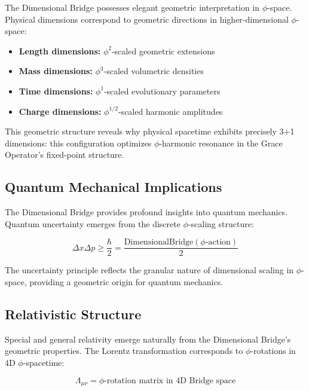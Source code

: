The Dimensional Bridge possesses elegant geometric interpretation in $\phi$-space. Physical dimensions correspond to geometric directions in higher-dimensional $\phi$-space:

\begin{itemize}
\item \textbf{Length dimensions:} $\phi^2$-scaled geometric extensions
\item \textbf{Mass dimensions:} $\phi^3$-scaled volumetric densities  
\item \textbf{Time dimensions:} $\phi^1$-scaled evolutionary parameters
\item \textbf{Charge dimensions:} $\phi^{1/2}$-scaled harmonic amplitudes
\end{itemize}

This geometric structure reveals why physical spacetime exhibits precisely 3+1 dimensions: this configuration optimizes $\phi$-harmonic resonance in the Grace Operator's fixed-point structure.

\subsection{Quantum Mechanical Implications}

The Dimensional Bridge provides profound insights into quantum mechanics. Quantum uncertainty emerges from the discrete $\phi$-scaling structure:

\begin{equation}
\Delta x \Delta p \geq \frac{\hbar}{2} = \frac{\text{DimensionalBridge}(\phi \text{-action})}{2}
\end{equation}

The uncertainty principle reflects the granular nature of dimensional scaling in $\phi$-space, providing a geometric origin for quantum mechanics.

\subsection{Relativistic Structure}

Special and general relativity emerge naturally from the Dimensional Bridge's geometric properties. The Lorentz transformation corresponds to $\phi$-rotations in 4D $\phi$-spacetime:

\begin{equation}
\Lambda_{\mu\nu} = \text{$\phi$-rotation matrix in 4D Bridge space}
\end{equation}

